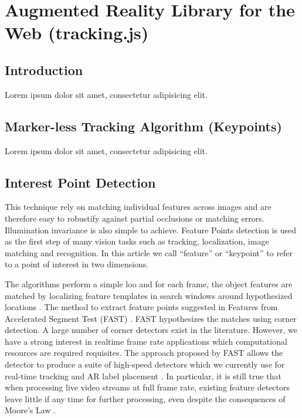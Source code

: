 \chapter{Augmented Reality Library for the Web (tracking.js)} %
\label{cha:ar_library_for_the_web}

\section{Introduction} %
\label{sec:ar_library_for_the_web:introduction}

Lorem ipsum dolor sit amet, consectetur adipisicing elit.


\section{Marker-less Tracking Algorithm (Keypoints)} %
\label{sec:ar_library_for_the_web:marker_less_tracking_algorithm}

Lorem ipsum dolor sit amet, consectetur adipisicing elit.


\section{Interest Point Detection} %
\label{sec:ar_library_for_the_web:interest_point_detection}

This technique rely on matching individual features across images and are therefore easy to robustify against partial occlusions or matching errors. Illumination invariance is also simple to achieve. Feature Points detection is used as the first step of many vision tasks such as tracking, localization, image matching and recognition. In this article we call ``feature'' or ``keypoint'' to refer to a point of interest in two dimensions.

The algorithms perform a simple loo and for each frame, the object features are matched by localizing feature templates in search windows around hypothesized locations \cite{Lepetit2005}. The method to extract feature points suggested in Features from Accelerated Segment Test (FAST) \cite{Rosten2010}. FAST hypothesizes the matches using corner detection. A large number of corner detectors exist in the literature. However, we have a strong interest in realtime frame rate applications which computational resources are required requisites. The approach proposed by FAST allows the detector to produce a suite of high-speed detectors which we currently use for real-time tracking and AR label placement \cite{Calonder2010}. In particular, it is still true that when processing live video streams at full frame rate, existing feature detectors leave little if any time for further processing, even despite the consequences of Moore’s Law \cite{Rosten2010}.

